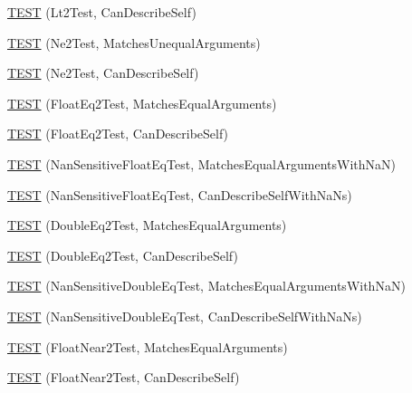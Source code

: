 \begin{DoxyCompactItemize}
\mbox{\hyperlink{namespacetesting_1_1gmock__matchers__test_a9f557c4688b2907704650cc18cfd9dcf}{T\+E\+ST}} (Lt2\+Test, Can\+Describe\+Self)
\item 
\mbox{\hyperlink{namespacetesting_1_1gmock__matchers__test_a69692057d2825f6fc8a37265667867c7}{T\+E\+ST}} (Ne2\+Test, Matches\+Unequal\+Arguments)
\item 
\mbox{\hyperlink{namespacetesting_1_1gmock__matchers__test_acedf2eda13385067ee70bdb7d6073427}{T\+E\+ST}} (Ne2\+Test, Can\+Describe\+Self)
\item 
\mbox{\hyperlink{namespacetesting_1_1gmock__matchers__test_a8c6f403990cc0fccf8450efee1c15002}{T\+E\+ST}} (Float\+Eq2\+Test, Matches\+Equal\+Arguments)
\item 
\mbox{\hyperlink{namespacetesting_1_1gmock__matchers__test_ad19d6e110e85c3e7883d07f50a4b2708}{T\+E\+ST}} (Float\+Eq2\+Test, Can\+Describe\+Self)
\item 
\mbox{\hyperlink{namespacetesting_1_1gmock__matchers__test_ae79a1197b9700a9c3299d5d6773bae60}{T\+E\+ST}} (Nan\+Sensitive\+Float\+Eq\+Test, Matches\+Equal\+Arguments\+With\+NaN)
\item 
\mbox{\hyperlink{namespacetesting_1_1gmock__matchers__test_acb2db40a51cacb3640e9e53550f22a05}{T\+E\+ST}} (Nan\+Sensitive\+Float\+Eq\+Test, Can\+Describe\+Self\+With\+Na\+Ns)
\item 
\mbox{\hyperlink{namespacetesting_1_1gmock__matchers__test_ac5d042ac79e58a41118a7c025df84265}{T\+E\+ST}} (Double\+Eq2\+Test, Matches\+Equal\+Arguments)
\item 
\mbox{\hyperlink{namespacetesting_1_1gmock__matchers__test_aca0555b5646f5553e131d98fd311bde6}{T\+E\+ST}} (Double\+Eq2\+Test, Can\+Describe\+Self)
\item 
\mbox{\hyperlink{namespacetesting_1_1gmock__matchers__test_ac3c08325efc35d2ce3a779082e133c68}{T\+E\+ST}} (Nan\+Sensitive\+Double\+Eq\+Test, Matches\+Equal\+Arguments\+With\+NaN)
\item 
\mbox{\hyperlink{namespacetesting_1_1gmock__matchers__test_a7f3c0b8340e424a6a41f7a0a00072791}{T\+E\+ST}} (Nan\+Sensitive\+Double\+Eq\+Test, Can\+Describe\+Self\+With\+Na\+Ns)
\item 
\mbox{\hyperlink{namespacetesting_1_1gmock__matchers__test_aff4b9c79cf64ea0348be61ced3fdf1d2}{T\+E\+ST}} (Float\+Near2\+Test, Matches\+Equal\+Arguments)
\item 
\mbox{\hyperlink{namespacetesting_1_1gmock__matchers__test_af9cf6709254ef2df314b8989abd0327f}{T\+E\+ST}} (Float\+Near2\+Test, Can\+Describe\+Self)
\item 

\end{DoxyCompactItemize}
